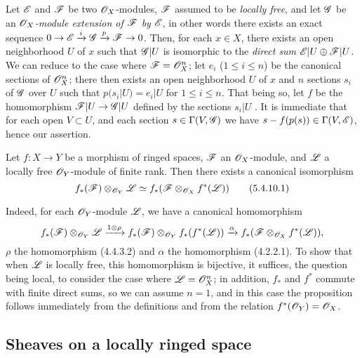 \begin{env}[5.4.9]
\label{0.5.4.9}
Let $\mathscr{E}$ and $\mathscr{F}$ be two $\mathscr{O}_X$-modules, $\mathscr{F}$ assumed to be \emph{locally free}, and let $\mathscr{G}$ be an \emph{$\mathscr{O}_X$-module extension of $\mathscr{F}$ by $\mathscr{E}$}, in other words there exists an exact sequence $0\to\sh{E}\xrightarrow{i}\sh{G}\xrightarrow{p}\sh{F}\to 0$.
Then, for each $x\in X$, there exists an open neighborhood $U$ of $x$ such that $\mathscr{G}|U$ is isomorphic to the \emph{direct sum $\mathscr{E}|U\oplus\mathscr{F}|U$}.
We can reduce to the case where $\mathscr{F}=\mathscr{O}_X^n$; let $e_i$ ($1\leq i\leq n$) be the canonical sections  of $\mathscr{O}_X^n$; there then exists an open neighborhood $U$ of $x$ and $n$ sections $s_i$ of $\mathscr{G}$ over $U$ such that $p(s_i|U)=e_i|U$ for $1\leq i\leq n$.
That being so, let $f$ be the homomorphism $\sh{F}|U\to\sh{G}|U$ defined by the sections $s_i|U$ .
It is immediate that for each open $V\subset U$, and each section $s\in\Gamma(V,\mathscr{G})$ we have $s-f(p(s))\in\Gamma(V,\mathscr{E})$, hence our assertion.
\end{env}

\begin{env}[5.4.10]
\label{0.5.4.10}
Let $f:X\to Y$ be a morphism of ringed spaces, $\mathscr{F}$ an $\mathscr{O}_X$-module, and $\mathscr{L}$ a locally free $\mathscr{O}_Y$-module of finite rank.
Then there exists a canonical isomorphism
\[
  f_*(\mathscr{F})\otimes_{\mathscr{O}_Y}\mathscr{L}\simeq f_*(\mathscr{F}\otimes_{\mathscr{O}_X}f^*(\mathscr{L}))
  \tag{5.4.10.1}
\]

Indeed, for each $\mathscr{O}_Y$-module $\mathscr{L}$, we have a canonical homomorphism
\[
  f_*(\mathscr{F})\otimes_{\mathscr{O}_Y}\mathscr{L}\xrightarrow{1\otimes\rho}f_*(\mathscr{F})\otimes_{\mathscr{O}_Y}f_*(f^*(\mathscr{L}))\xrightarrow{\alpha}f_*(\mathscr{F}\otimes_{\mathscr{O}_X}f^*(\mathscr{L})),
\]
$\rho$ the homomorphism (4.4.3.2) and $\alpha$ the homomorphism (4.2.2.1).
To show that when $\mathscr{L}$ is locally free, this homomorphism is bijective, it suffices, the question being local, to consider the case where $\mathscr{L}=\mathscr{O}_X^n$;
in addition, $f_*$ and $f^*$ commute with finite direct sums, so we can assume $n=1$, and in this case the proposition follows immediately from the definitions and from the relation $f^*(\mathscr{O}_Y)=\mathscr{O}_X$.
\end{env}

\subsection{Sheaves on a locally ringed space}
\label{subsection:sheaves-on-lrs}

